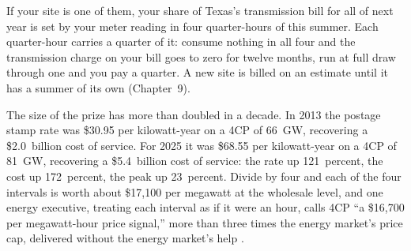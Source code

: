 If your site is one of them, your share of Texas's transmission bill for all of next year is set by your meter reading in four quarter-hours of this summer. Each quarter-hour carries a quarter of it: consume nothing in all four and the transmission charge on your bill goes to zero for twelve months, run at full draw through one and you pay a quarter. A new site is billed on an estimate until it has a summer of its own (Chapter~9). %

The size of the prize has more than doubled in a decade. In 2013 the postage stamp rate was \$30.95 per kilowatt-year on a 4CP of 66~GW, recovering a \$2.0~billion cost of service. %
For 2025 it was \$68.55 per kilowatt-year on a 4CP of 81~GW, recovering a \$5.4~billion cost of service: the rate up 121~percent, the cost up 172~percent, the peak up 23~percent. %
Divide by four and each of the four intervals is worth about \$17,100 per megawatt at the wholesale level, and one energy executive, treating each interval as if it were an hour, calls 4CP ``a \$16,700 per megawatt-hour price signal,'' more than three times the energy market's price cap, delivered without the energy market's help \autocite{puct2025docket57491matrix,puct2013docket40946matrix,kavulla2025remarks}. %

